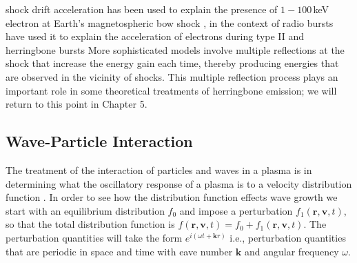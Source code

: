 shock drift acceleration has been used to explain the presence of $1-100$\,keV electron at Earth's magnetospheric bow shock \citep{wu1984}, in the context of radio bursts have used it to explain the acceleration of electrons during type II and herringbone bursts \citep{holman1983, mann2005, schmidt2012b}
More sophisticated models involve multiple reflections at the shock that increase the energy gain each time, thereby producing energies that are observed in the vicinity of shocks. This multiple reflection process plays an important role in some theoretical treatments of herringbone emission; we will return to this point in Chapter 5.



\subsection{Wave-Particle Interaction}\label{sec:31}


The treatment of the interaction of particles and waves in a plasma is in determining what the oscillatory response of a plasma is to a velocity distribution function \citep{inan2011}. In order to see how the distribution function effects wave growth we start with an equilibrium distribution $f_0$ and impose a perturbation $f_1(\mathbf{r}, \mathbf{v}, t)$, so that the total distribution function is $f(\mathbf{r}, \mathbf{v}, t) = f_0 +f_1(\mathbf{r}, \mathbf{v}, t)$.  The perturbation quantities will take the form $e^{i(\omega t + \mathbf{k}r)}$ i.e., perturbation quantities that are periodic in space and time with eave number $\mathbf{k}$ and angular frequency $\omega$.

